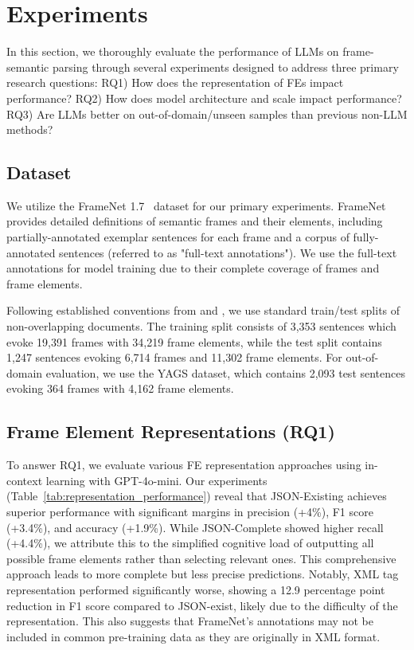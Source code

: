 \section{Experiments}
In this section, we thoroughly evaluate the performance of LLMs on frame-semantic parsing through several experiments designed to address three primary research questions: RQ1) How does the representation of FEs impact performance? RQ2) How does model architecture and scale impact performance? RQ3) Are LLMs better on out-of-domain/unseen samples than previous non-LLM methods?

\subsection{Dataset}
We utilize the FrameNet 1.7~\cite{FramenetExtended} dataset for our primary experiments. FrameNet provides detailed definitions of semantic frames and their elements, including partially-annotated exemplar sentences for each frame and a corpus of fully-annotated sentences (referred to as "full-text annotations"). We use the full-text annotations for model training due to their complete coverage of frames and frame elements.

Following established conventions from \citet{opensesame} and \citet{das-smith-2011-semi}, we use standard train/test splits of non-overlapping documents. The training split consists of 3,353 sentences which evoke 19,391 frames with 34,219 frame elements, while the test split contains 1,247 sentences evoking 6,714 frames and 11,302 frame elements. For out-of-domain evaluation, we use the YAGS dataset, which contains 2,093 test sentences evoking 364 frames with 4,162 frame elements.


\subsection{Frame Element Representations (RQ1)}
To answer RQ1, we evaluate various FE representation approaches using in-context learning with GPT-4o-mini. Our experiments (Table~\ref{tab:representation_performance}) reveal that JSON-Existing achieves superior performance with significant margins in precision (+4\%), F1 score (+3.4\%), and accuracy (+1.9\%). While JSON-Complete showed higher recall (+4.4\%), we attribute this to the simplified cognitive load of outputting all possible frame elements rather than selecting relevant ones. This comprehensive approach leads to more complete but less precise predictions. Notably, XML tag representation performed significantly worse, showing a 12.9 percentage point reduction in F1 score compared to JSON-exist, likely due to the difficulty of the representation. This also suggests that FrameNet's annotations may not be included in common pre-training data as they are originally in XML format. 


